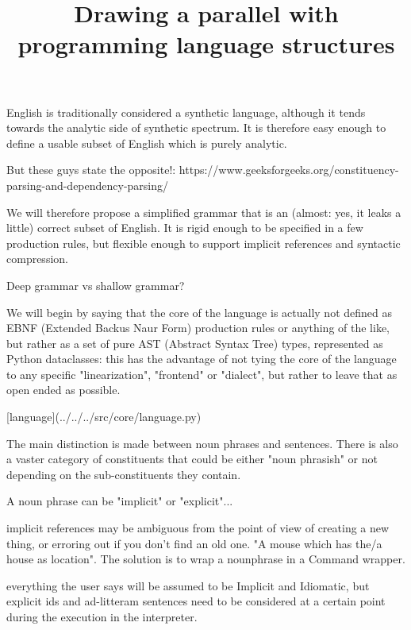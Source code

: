 English is traditionally considered a synthetic language, although it tends towards the analytic side of synthetic spectrum. It is therefore easy enough to define a usable subset of English which is purely analytic.


But these guys state the opposite!:
https://www.geeksforgeeks.org/constituency-parsing-and-dependency-parsing/

We will therefore propose a simplified grammar that is an (almost: yes, it leaks a little) correct subset of English. It is rigid enough to be specified in a few production rules, but flexible enough to support implicit references and syntactic compression.


Deep grammar vs shallow grammar?

We will begin by saying that the core of the language is actually not defined as EBNF (Extended Backus Naur Form) production rules or anything of the like, but rather as a set of pure AST (Abstract Syntax Tree) types, represented as Python dataclasses: this has the advantage of not tying the core of the language to any specific "linearization", "frontend" or "dialect", but rather to leave that as open ended as possible.

[language](../../../src/core/language.py)

The main distinction is made between noun phrases and sentences. There is also a vaster category of constituents that could be either "noun phrasish" or not depending on the sub-constituents they contain.

A noun phrase can be "implicit" or "explicit"...


implicit references may be ambiguous from the point of view of creating a new thing, or erroring out if you don't find an old one. "A mouse which has the/a house as location". The solution is to wrap a nounphrase in a Command wrapper.


everything the user says will be assumed to be Implicit and Idiomatic, but explicit ids and ad-litteram sentences need to be considered at a certain point during the execution in the interpreter.



\title{ Drawing a parallel with programming language structures}

